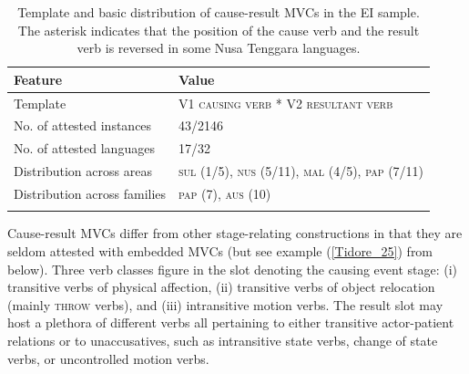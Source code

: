 \begin{table}
\begin{tabular}{ll}
\lsptoprule
Feature&Value\tabularnewline
\midrule
Template&V1 \textsc{causing verb} * V2 \textsc{resultant verb}\tabularnewline
No. of attested instances& 43/2146 \tabularnewline
No. of attested languages& 17/32 \tabularnewline
Distribution across areas& \textsc{sul} (1/5), \textsc{nus} (5/11), \textsc{mal} (4/5), \textsc{pap} (7/11) \tabularnewline
Distribution across families& \textsc{pap} (7), \textsc{aus} (10) \tabularnewline
\lspbottomrule
\end{tabular}
\caption[Template and basic distribution of cause-result MVCs]{Template and basic distribution of cause-result MVCs in the EI sample. The asterisk indicates that the position of the cause verb and the result verb is reversed in some Nusa Tenggara languages.}
\label{table:cause-result}
\end{table}

Cause-result MVCs differ from other stage-relating constructions in that they are seldom attested with embedded MVCs (but see example (\ref{Tidore_25}) from  below). Three verb classes figure in the slot denoting the causing event stage: (i) transitive verbs of physical affection, (ii) transitive verbs of object relocation (mainly \textsc{throw} verbs), and (iii) intransitive motion verbs. The result slot may host a plethora of different verbs all pertaining to either transitive actor-patient relations or to unaccusatives, such as intransitive state verbs, change of state verbs, or uncontrolled motion verbs. 

